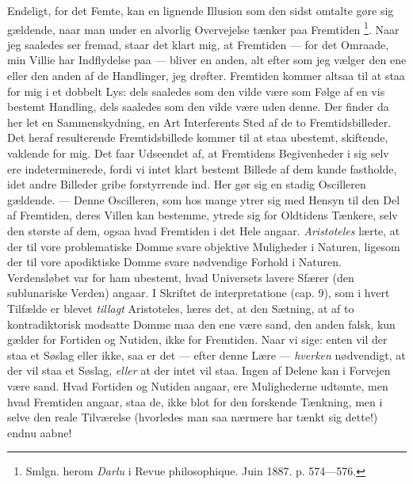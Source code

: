 \documentclass[12pt,a4paper,openany]{book}
\begin{document}
Endeligt, for det Femte, kan en lignende Illusion som den sidst omtalte gøre
sig gældende, naar man under en alvorlig Overvejelse tænker paa Fremtiden%
\footnote[1]{Smlgn. herom \emph{Darlu} i Revue philosophique. Juin 1887. p.
574---576.}. Naar jeg saaledes ser fremad, staar det klart mig, at Fremtiden
--- for det Omraade, min Villie har Indflydelse paa --- bliver en anden, alt
efter som jeg vælger den ene eller den anden af de Handlinger, jeg drøfter.
Fremtiden kommer altsaa til at staa for mig i et dobbelt Lys: dels saaledes som
den vilde være som Følge af en vis bestemt Handling, dels saaledes som den
vilde være uden denne. Der finder da her let en Sammenskydning, en Art
Interferents Sted af de to Fremtidsbilleder. Det heraf resulterende
Fremtidsbillede kommer til at staa ubestemt, skiftende, vaklende for mig. Det
faar Udseendet af, at Fremtidens Begivenheder i sig selv ere indeterminerede,
fordi vi intet klart bestemt Billede af dem kunde fastholde, idet andre
Billeder gribe forstyrrende ind. Her gør sig en stadig Oscilleren gældende. ---
Denne Oscilleren, som hos mange ytrer sig med Hensyn til den Del af Fremtiden,
deres Villen kan bestemme, ytrede sig for Oldtidens Tænkere, selv den største
af dem, ogsaa hvad Fremtiden i det Hele angaar. \emph{Aristoteles} lærte, at
der til vore problematiske Domme svare objektive Muligheder i Naturen, ligesom
der til vore apodiktiske Domme svare nødvendige Forhold i Naturen. Verdensløbet
var for ham ubestemt, hvad Universets lavere Sfærer (den sublunariske Verden)
angaar. I Skriftet de interpretatione (cap. 9), som i hvert Tilfælde er blevet
\emph{tillagt} Aristoteles, læres det, at den Sætning, at af to kontradiktorisk
modsatte Domme maa den ene være sand, den anden falsk, kun gælder for Fortiden
og Nutiden, ikke for Fremtiden. Naar vi sige: enten vil der staa et Søslag
eller ikke, saa er det --- efter denne Lære --- \emph{hverken} nødvendigt, at
der vil staa et Søslag, \emph{eller} at der intet vil staa. Ingen af Delene kan
i Forvejen være sand. Hvad Fortiden og Nutiden angaar, ere Mulighederne
udtømte, men hvad Fremtiden angaar, staa de, ikke blot for den forskende
Tænkning, men i selve den reale Tilværelse (hvorledes man saa nærmere har tænkt
sig dette!) endnu aabne!%
\end{document}
